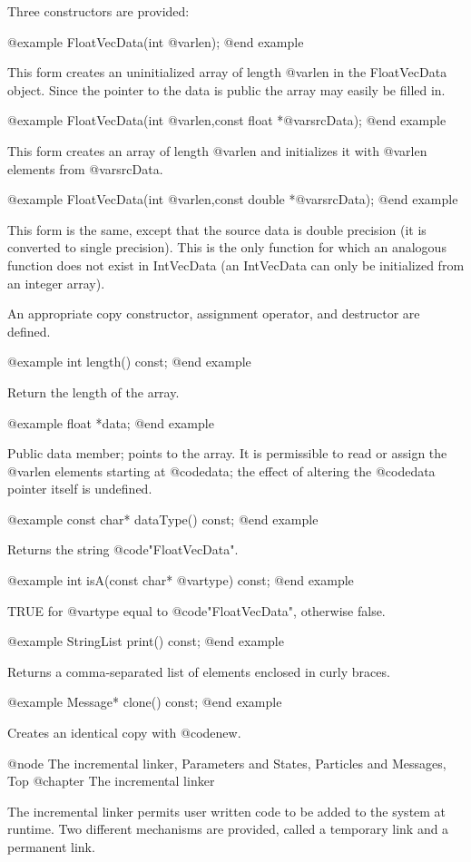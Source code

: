 Three constructors are provided:

@example
FloatVecData(int @var{len});
@end example

This form creates an uninitialized array of length @var{len} in the
FloatVecData object.  Since the pointer to the data is public the
array may easily be filled in.

@example
FloatVecData(int @var{len},const float *@var{srcData});
@end example

This form creates an array of length @var{len} and initializes it with
@var{len} elements from @var{srcData}.

@example
FloatVecData(int @var{len},const double *@var{srcData});
@end example

This form is the same, except that the source data is double precision
(it is converted to single precision).  This is the only function for
which an analogous function does not exist in IntVecData (an IntVecData
can only be initialized from an integer array).

An appropriate copy constructor, assignment operator, and destructor
are defined.

@example
int length() const;
@end example

Return the length of the array.

@example
float *data;
@end example

Public data member; points to the array.  It is permissible to read or
assign the @var{len} elements starting at @code{data}; the effect of
altering the @code{data} pointer itself is undefined.

@example
const char* dataType() const;
@end example

Returns the string @code{"FloatVecData"}.

@example
int isA(const char* @var{type}) const;
@end example

TRUE for @var{type} equal to @code{"FloatVecData"}, otherwise false.

@example
StringList print() const;
@end example

Returns a comma-separated list of elements enclosed in curly braces.

@example
Message* clone() const;
@end example

Creates an identical copy with @code{new}.

@node The incremental linker, Parameters and States, Particles and Messages, Top
@chapter The incremental linker

The incremental linker permits user written code to be added to the
system at runtime.  Two different mechanisms are provided, called
a temporary link and a permanent link.


